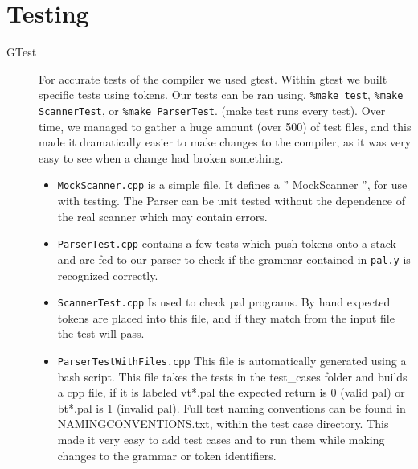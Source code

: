 \documentclass{article}
\begin{document}
\section*{Testing}
\begin{description}
	
\item[GTest]
	For accurate tests of the compiler we used gtest. Within gtest we
	built specific tests using tokens. Our tests can be ran using,
	\texttt{\%make test}, \texttt{\%make ScannerTest}, or \texttt{\%make ParserTest}.
	(make test runs every test). Over time, we managed to gather a huge amount (over 500) of test
	files, and this made it dramatically easier to make changes to the compiler, as it was
	very easy to see when a change had broken something.
	\begin{itemize}
		\item \texttt{MockScanner.cpp} is a simple file. It defines a 
		'' MockScanner '', for use with testing. The Parser can be unit tested
		without the dependence of the real scanner which may contain errors.
		\item \texttt{ParserTest.cpp} contains a few tests which push
		tokens onto a stack and are fed to our parser to check if the 
		grammar contained in  \texttt{pal.y} is recognized correctly.
		
		\item \texttt{ScannerTest.cpp} Is used to check pal programs.
		By hand expected tokens are placed into this file, and if they match
		from the input file the test will pass.
		
		\item \texttt{ParserTestWithFiles.cpp} This file is automatically
		generated using a bash script. This file takes the tests in
		the test\_cases folder and builds a cpp file, if it is labeled vt*.pal
		the expected return is 0 (valid pal) or bt*.pal is 1 (invalid pal).
		Full test naming conventions can be found in NAMINGCONVENTIONS.txt,
		within the test case directory.
		This made it very easy to add test cases and to run them while making 
		changes to the grammar or token identifiers.
	

\end{itemize}
\end{description}
\end{document}

